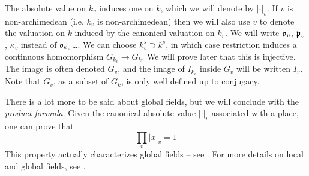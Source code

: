 \documentclass{article}
\begin{document}
The absolute value on $k_v$ induces one on $k$, which we will denote by 
$|\cdot|_v$. If $v$ is non-archimedean (i.e. $k_v$ is non-archimedean) then we 
will also use $v$ to denote the valuation on $k$ induced by the canonical 
valuation on $k_v$. We will write $\mathfrak{o}_v$, $\mathfrak{p}_v$, $\kappa_v$ instead of 
$\mathfrak{o}_{k_v}$\ldots. We can choose $k_v^s\supset k^s$, in which case restriction 
induces a continuous homomorphism $G_{k_v} \to G_k$. We will prove later that 
this is injective. The image is often denoted $G_v$, and the image of 
$I_{k_v}$ inside $G_v$ will be written $I_v$. Note that $G_v$, as a subset of 
$G_k$, is only well defined up to conjugacy. 

There is a lot more to be said about global fields, but we will conclude with 
the \emph{product formula}. Given the canonical absolute value $|\cdot|_v$ 
associated with a place, one can prove that 
\[
  \prod_v |x|_v = 1
\]
This property actually characterizes global fields -- see \cite{ar45}. For 
more details on local and global fields, see \cite{we95}. 












\end{document}
